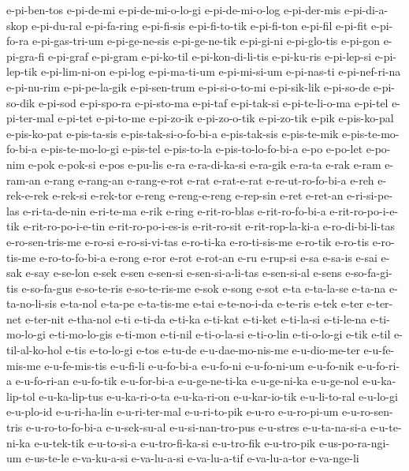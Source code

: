 {e-pi-ben-tos e-pi-de-mi e-pi-de-mi-o-lo-gi e-pi-de-mi-o-log e-pi-der-mis
e-pi-di-a-skop e-pi-du-ral e-pi-fa-ring e-pi-fi-sis e-pi-fi-to-tik
e-pi-fi-ton e-pi-fil e-pi-fit e-pi-fo-ra e-pi-gas-tri-um e-pi-ge-ne-sis
e-pi-ge-ne-tik e-pi-gi-ni e-pi-glo-tis e-pi-gon e-pi-gra-fi e-pi-graf
e-pi-gram e-pi-ko-til e-pi-kon-di-li-tis e-pi-ku-ris e-pi-lep-si
e-pi-lep-tik e-pi-lim-ni-on e-pi-log e-pi-ma-ti-um e-pi-mi-si-um
e-pi-nas-ti e-pi-nef-ri-na e-pi-nu-rim e-pi-pe-la-gik e-pi-sen-trum
e-pi-si-o-to-mi e-pi-sik-lik e-pi-so-de e-pi-so-dik e-pi-sod e-pi-spo-ra
e-pi-sto-ma e-pi-taf e-pi-tak-si e-pi-te-li-o-ma e-pi-tel e-pi-ter-mal
e-pi-tet e-pi-to-me e-pi-zo-ik e-pi-zo-o-tik e-pi-zo-tik e-pik
e-pis-ko-pal e-pis-ko-pat e-pis-ta-sis e-pis-tak-si-o-fo-bi-a
e-pis-tak-sis e-pis-te-mik e-pis-te-mo-fo-bi-a e-pis-te-mo-lo-gi e-pis-tel
e-pis-to-la e-pis-to-lo-fo-bi-a e-po e-po-let e-po-nim e-pok e-pok-si
e-pos e-pu-lis e-ra e-ra-di-ka-si e-ra-gik e-ra-ta e-rak e-ram e-ram-an
e-rang e-rang-an e-rang-e-rot e-rat e-rat-e-rat e-re-ut-ro-fo-bi-a e-reh
e-rek-e-rek e-rek-si e-rek-tor e-reng e-reng-e-reng e-rep-sin e-ret
e-ret-an e-ri-si-pe-las e-ri-ta-de-nin e-ri-te-ma e-rik e-ring
e-rit-ro-blas e-rit-ro-fo-bi-a e-rit-ro-po-i-e-tik e-rit-ro-po-i-e-tin
e-rit-ro-po-i-es-is e-rit-ro-sit e-rit-rop-la-ki-a e-ro-di-bi-li-tas
e-ro-sen-tris-me e-ro-si e-ro-si-vi-tas e-ro-ti-ka e-ro-ti-sis-me e-ro-tik
e-ro-tis e-ro-tis-me e-ro-to-fo-bi-a e-rong e-ror e-rot e-rot-an e-ru
e-rup-si e-sa e-sa-is e-sai e-sak e-say e-se-lon e-sek e-sen e-sen-si
e-sen-si-a-li-tas e-sen-si-al e-sens e-so-fa-gi-tis e-so-fa-gus
e-so-te-ris e-so-te-ris-me e-sok e-song e-sot e-ta e-ta-la-se e-ta-na
e-ta-no-li-sis e-ta-nol e-ta-pe e-ta-tis-me e-tai e-te-no-i-da e-te-ris
e-tek e-ter e-ter-net e-ter-nit e-tha-nol e-ti e-ti-da e-ti-ka e-ti-kat
e-ti-ket e-ti-la-si e-ti-le-na e-ti-mo-lo-gi e-ti-mo-lo-gis e-ti-mon
e-ti-nil e-ti-o-la-si e-ti-o-lin e-ti-o-lo-gi e-tik e-til e-til-al-ko-hol
e-tis e-to-lo-gi e-tos e-tu-de e-u-dae-mo-nis-me e-u-dio-me-ter
e-u-fe-mis-me e-u-fe-mis-tis e-u-fi-li e-u-fo-bi-a e-u-fo-ni e-u-fo-ni-um
e-u-fo-nik e-u-fo-ri-a e-u-fo-ri-an e-u-fo-tik e-u-for-bi-a
e-u-ge-ne-ti-ka e-u-ge-ni-ka e-u-ge-nol e-u-ka-lip-tol e-u-ka-lip-tus
e-u-ka-ri-o-ta e-u-ka-ri-on e-u-kar-io-tik e-u-li-to-ral e-u-lo-gi
e-u-plo-id e-u-ri-ha-lin e-u-ri-ter-mal e-u-ri-to-pik e-u-ro e-u-ro-pi-um
e-u-ro-sen-tris e-u-ro-to-fo-bi-a e-u-sek-su-al e-u-si-nan-tro-pus
e-u-stres e-u-ta-na-si-a e-u-te-ni-ka e-u-tek-tik e-u-to-si-a
e-u-tro-fi-ka-si e-u-tro-fik e-u-tro-pik e-us-po-ra-ngi-um e-us-te-le
e-va-ku-a-si e-va-lu-a-si e-va-lu-a-tif e-va-lu-a-tor e-va-nge-li
}
